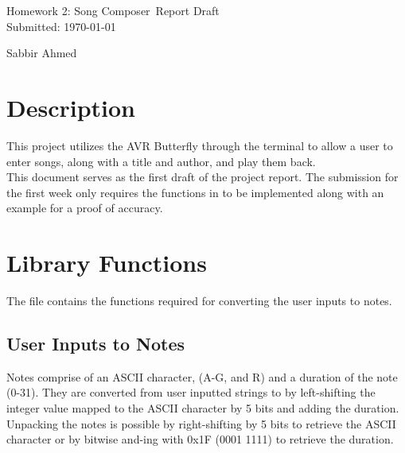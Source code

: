 \documentclass[usletter, 12pt]{article}
\newcommand{\project}{Homework 2: Song Composer}
\newcommand{\Sabbir}{Sabbir Ahmed}
\begin{document}

    \begin{titlepage}

        \vspace*{\fill} %
        \begin{center}

            {\LARGE \project~Report Draft}\\ [1.5cm]

            Submitted: \today
            
            \vspace*{\fill}

            \Sabbir

        \end{center}
        \vspace*{\fill} %

    \end{titlepage}

    \section{Description}

    This project utilizes the AVR Butterfly through the terminal to allow a user to enter songs, along with a title and author, and play them back. \\
    This document serves as the first draft of the project report. The submission for the first week only requires the functions in  to be implemented along with an example for a proof of accuracy.

    \section{Library Functions}

    The  file contains the functions required for converting the user inputs to notes.

        \subsection{User Inputs to Notes}

        Notes comprise of an ASCII character, (A-G, and R) and a duration of the note (0-31). They are converted from user inputted strings to  by left-shifting the integer value mapped to the ASCII character by 5 bits and adding the duration. \\
        Unpacking the notes is possible by right-shifting by 5 bits to retrieve the ASCII character or by bitwise and-ing with 0x1F (0001 1111) to retrieve the duration.
\end{document}
